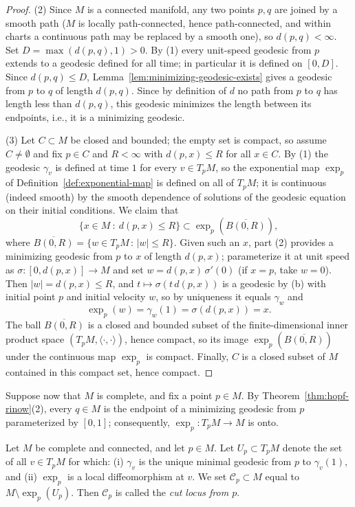 \begin{proof}
(2) Since $M$ is a connected manifold, any two points $p,q$ are
joined by a smooth path ($M$ is locally path-connected, hence
path-connected, and within charts a continuous path may be
replaced by a smooth one), so $d(p,q)<\infty$. Set
$D=\max(d(p,q),1)>0$. By (1) every
unit-speed geodesic from $p$ extends to a geodesic defined for
all time; in particular it is defined on $[0,D]$. Since
$d(p,q)\le D$, Lemma~\ref{lem:minimizing-geodesic-exists} gives a
geodesic from $p$ to $q$ of length $d(p,q)$. Since by definition of $d$ no
path from $p$ to $q$ has length less than $d(p,q)$, this geodesic
minimizes the length between its endpoints, i.e., it is a
minimizing geodesic.

(3) Let $C\subset M$ be closed and bounded; the empty set is
compact, so assume $C\not=\emptyset$ and fix $p\in C$ and
$R<\infty$ with $d(p,x)\le R$ for all $x\in C$. By (1) the
geodesic $\gamma_v$ is defined at time $1$ for every $v\in T_pM$,
so the exponential map $\exp_p$ of
Definition~\ref{def:exponential-map} is defined on all of
$T_pM$; it is continuous (indeed smooth) by the smooth dependence
of solutions of the geodesic equation on their initial
conditions. We claim that
$$\{x\in M\ :\ d(p,x)\le R\}\subset
\exp_p\left(\overline{B(0,R)}\right),$$
where $\overline{B(0,R)}=\{w\in T_pM\,:\,|w|\le R\}$. Given such
an $x$, part (2) provides a minimizing geodesic from $p$ to $x$
of length $d(p,x)$; parameterize it at unit speed as
$\sigma\colon[0,d(p,x)]\rightarrow M$ and set
$w=d(p,x)\,\sigma'(0)$ (if $x=p$, take $w=0$). Then
$|w|=d(p,x)\le R$, and $t\mapsto\sigma(t\,d(p,x))$ is a geodesic
by (b) with initial point $p$ and initial velocity $w$, so by
uniqueness it equals $\gamma_w$ and
$$\exp_p(w)=\gamma_w(1)=\sigma(d(p,x))=x.$$
The ball $\overline{B(0,R)}$ is a closed and bounded subset of
the finite-dimensional inner product space
$(T_pM,\langle\cdot,\cdot\rangle)$, hence compact, so its image
$\exp_p\left(\overline{B(0,R)}\right)$ under the continuous map
$\exp_p$ is compact. Finally, $C$ is a closed subset of $M$
contained in this compact set, hence compact.
\end{proof}

Suppose now that $M$ is complete, and fix a point $p\in M$. By
Theorem~\ref{thm:hopf-rinow}(2), every $q\in M$ is the endpoint
of a minimizing geodesic from $p$ parameterized by $[0,1]$;
consequently, $\exp_p\colon T_pM\to M$ is onto.

\begin{definition}
\label{def:cut-locus}
Let $M$ be complete and connected, and let $p\in M$. Let $U_p\subset T_pM$ denote
the set of all $v\in T_pM$ for which: (i) $\gamma_v$ is the unique
minimal geodesic from $p$ to $\gamma_v(1)$, and (ii) $\exp_p$ is
a local diffeomorphism at $v$. We set ${\mathcal C}_p\subset M$
equal to $M\setminus \exp_p(U_p)$. Then ${\mathcal C}_p$ is
called the {\sl cut locus from $p$}.
\end{definition}

